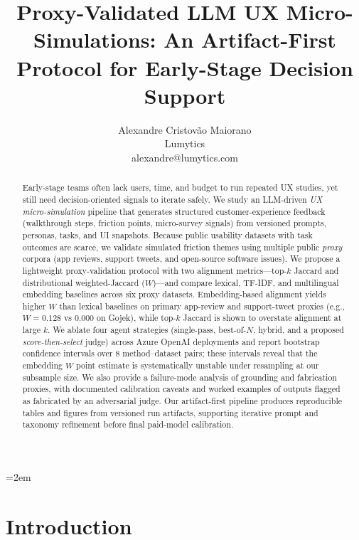 \documentclass[10pt]{article}
\title{Proxy-Validated LLM UX Micro-Simulations: An Artifact-First Protocol for Early-Stage Decision Support}
\author{Alexandre Cristov\~ao Maiorano\\Lumytics\\alexandre@lumytics.com}
\date{}
\begin{document}
\emergencystretch=2em
\maketitle

\begin{abstract}
Early-stage teams often lack users, time, and budget to run repeated UX studies,
yet still need decision-oriented signals to iterate safely.
We study an LLM-driven \emph{UX micro-simulation} pipeline that generates structured
customer-experience feedback (walkthrough steps, friction points, micro-survey signals)
from versioned prompts, personas, tasks, and UI snapshots.
Because public usability datasets with task outcomes are scarce, we validate simulated
friction themes using multiple public \emph{proxy} corpora (app reviews, support tweets,
and open-source software issues). We propose a lightweight proxy-validation protocol with two alignment metrics---top-$k$ Jaccard and distributional weighted-Jaccard ($W$)---and compare lexical, TF-IDF, and multilingual embedding baselines across six proxy datasets.
Embedding-based alignment yields higher $W$ than lexical baselines on primary app-review and support-tweet proxies (e.g., $W{=}0.128$ vs $0.000$ on Gojek), while top-$k$ Jaccard is shown to overstate alignment at large $k$.
We ablate four agent strategies (single-pass, best-of-$N$, hybrid, and a proposed \emph{score-then-select} judge) across Azure OpenAI deployments and report bootstrap confidence intervals over $8$ method--dataset pairs; these intervals reveal that the embedding $W$ point estimate is systematically unstable under resampling at our subsample size.
We also provide a failure-mode analysis of grounding and fabrication proxies, with documented calibration caveats and worked examples of outputs flagged as fabricated by an adversarial judge.
Our artifact-first pipeline produces reproducible tables and figures from versioned run
artifacts, supporting iterative prompt and taxonomy refinement before final paid-model
calibration.
\end{abstract}

\section{Introduction}

\end{document}
